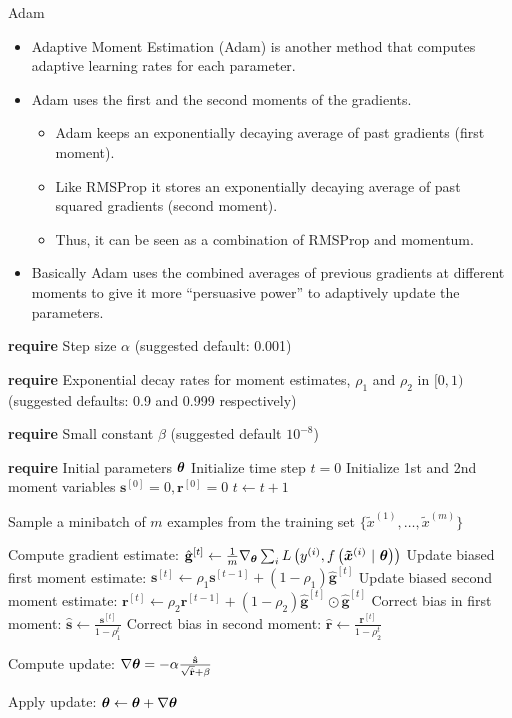 \documentclass[11pt,compress,t,notes=noshow, xcolor=table]{beamer}
\begin{document}
\begin{vbframe}{Adam}
	\begin{itemize}
		\item Adaptive Moment Estimation (Adam) is another method that computes adaptive learning rates for each parameter.
		\item Adam uses the first and the second moments of the gradients.
		\begin{itemize}
			\item Adam keeps an exponentially decaying average of past gradients (first moment).
			\item Like RMSProp it stores an exponentially decaying average of past squared gradients (second moment).
			\item Thus, it can be seen as a combination of RMSProp and momentum.
		\end{itemize}
		\item Basically Adam uses the combined averages of previous gradients at different moments to give it more \enquote{persuasive power} to adaptively update the parameters.
	\end{itemize}
	
	
	\framebreak
	
	\begin{algorithm}[H]
		\scriptsize 
		\caption{Adam}
		\begin{algorithmic}[1]
			\State \textbf{require} Step size $\alpha$ (suggested default: 0.001) \strut
			\State \parbox[t]{\dimexpr\linewidth-\algorithmicindent}{\textbf{require} Exponential decay rates for moment estimates, $\rho_1$ and $\rho_2$ in $[0,1)$ (suggested defaults: 0.9 and 0.999 respectively)} \strut
			\State \parbox[t]{\dimexpr\linewidth-\algorithmicindent}{\textbf{require} Small constant $\beta$ (suggested default $10^{-8}$) \strut}
			\State \textbf{require} Initial parameters $\bm{\theta}$ 
			\State Initialize time step $t = 0$
			\State Initialize 1st and 2nd moment variables $\mathbf{s}^{[0]} = 0, \mathbf{r}^{[0]} = 0$
			\State $t \leftarrow t + 1$
			\State \parbox[t]{\dimexpr\linewidth-\algorithmicindent}{Sample a minibatch of $m$ examples from the training set $\{\tilde{x}^{(1)},\dots,\tilde{x}^{(m)}\}$ \strut}
			\State Compute gradient estimate: $\hat{\mathbf{g}}^{[t]} \leftarrow \frac{1}{m} \nabla_{\bm{\theta}} \sum_{i} L\left(y^{(i)}, f\left(\bm{\tilde{x}}^{(i)} ~|~ \bm{\theta}\right)\right)$
			\State Update biased first moment estimate: $\mathbf{s}^{[t]} \leftarrow \rho_1 \mathbf{s}^{[t-1]}  + (1 - \rho_1) \hat{\mathbf{g}}^{[t]}$
			\State Update biased second moment estimate: $\mathbf{r}^{[t]} \leftarrow \rho_2 \mathbf{r}^{[t-1]}  + (1 - \rho_2) \hat{\mathbf{g}}^{[t]} \odot \hat{\mathbf{g}}^{[t]}$
			\State Correct bias in first moment: $\hat{\mathbf{s}} \leftarrow \frac{\mathbf{s}^{[t]} }{1-\rho_1^t}$
			\State Correct bias in second moment: $\hat{\mathbf{r}} \leftarrow \frac{\mathbf{r}^{[t]} }{1-\rho_2^t}$
			\State \parbox[t]{\dimexpr\linewidth-\algorithmicindent}{Compute update: $\nabla\bm{\theta} = - \alpha \frac{\hat{\mathbf{s}}}{\sqrt{\hat{\mathbf{r}}} + \beta}$ \strut}
			\State Apply update: $\bm{\theta} \leftarrow \bm{\theta} + \nabla\bm{\theta}$
			

\end{algorithmic}
\end{algorithm}
\end{vbframe}
\end{document}
